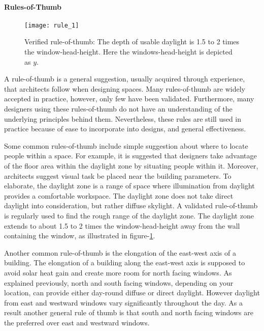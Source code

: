   \paragraph{Rules-of-Thumb}

  \begin{figure}[h]
  \centering
  \texttt{[image: rule\_1]}
  \label{fig:rule_1}
  \caption{Verified rule-of-thumb: The depth of usable daylight is 1.5 to 2 times the window-head-height. Here the windows-head-height is depicted as $y$.}
  \end{figure}

  A rule-of-thumb is a general suggestion, usually acquired through experience, that architects follow when designing spaces. 
  Many rules-of-thumb are widely accepted in practice, however, only few have been validated\cite{reinhart2005simulation}.
  Furthermore, many designers using these rules-of-thumb do not have an understanding of the underlying principles behind them\cite{Galasiu}.
  Nevertheless, these rules are still used in practice because of ease to incorporate into designs, and general effectiveness.

  Some common rules-of-thumb include simple suggestion about where to locate people within a space.
  For example, it is suggested that designers take advantage of the floor area within the daylight zone by situating people within it. \cite{Leslie}
  Moreover, architects suggest visual task be placed near the building parameters\cite{Leslie}.
  To elaborate, the daylight zone is a range of space where illumination from daylight provides a comfortable workspace. 
  The daylight zone does not take direct daylight into consideration, but rather diffuse skylight.
  A validated rule-of-thumb is regularly used to find the rough range of the daylight zone\cite{reinhart2005simulation}. 
  The daylight zone extends to about 1.5 to 2 times the window-head-height away from the wall containing the window, as illustrated in figure-\ref{fig:rule_1}.

  Another common rule-of-thumb is the elongation of the east-west axis of a building.
  The elongation of a building along the east-west axis is supposed to avoid solar heat gain and create more room for north facing windows\cite{Leslie}.
  As explained previously, north and south facing windows, depending on your location, can provide either day-round diffuse or direct daylight.
  However daylight from east and westward windows vary significantly throughout the day.
  As a result another general rule of thumb is that south and north facing windows are the preferred over east and westward windows\cite{reinhart_lecture}.


